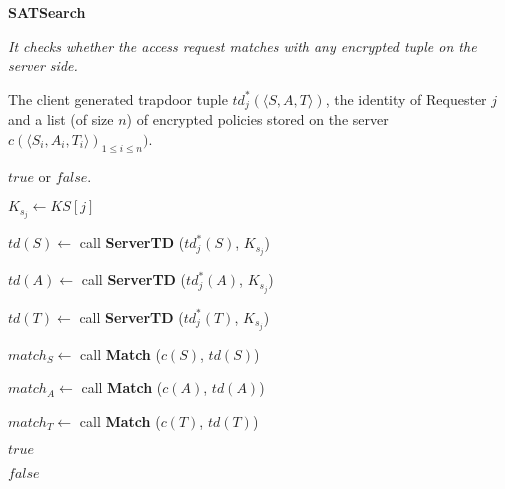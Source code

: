 \documentclass[epsfig,a4paper,11pt,titlepage]{book}
\numberwithin{algorithm}{chapter}
\newcommand{\algofontsize}{\fontsize{11}{12}\selectfont}
\begin{document}
\begin{algorithm} [htp]
{\algofontsize
\caption{\textbf{SATSearch}}

\label{algo:espoon-search-sat}

\begin{algorithmic}[1]

\INPUT \emph{It checks whether the access request matches with any encrypted tuple on the server side.}

\Require The client generated trapdoor tuple $td^*_j (\langle S, A, T \rangle)$, the identity of Requester $j$ and a list (of size $n$) of encrypted policies stored on the server $c(\langle S_i, A_i, T_i \rangle)_{1 \leq i \leq n})$.

\Ensure $\mathit{true}$ or $\mathit{false}$.

\medskip

\State $K_{s_j} \leftarrow KS[j]$ {\algofontsize {}} \label{line:espoon-search-sat-ks}

\State $td(S) \leftarrow$ call \textbf{ServerTD} ($td^*_j (S)$, $K_{s_j}$) \label{line:espoon-search-sat-td-s}

\State $td(A) \leftarrow$ call \textbf{ServerTD} ($td^*_j (A)$, $K_{s_j}$) \label{line:espoon-search-sat-td-a}

\State $td(T) \leftarrow$ call \textbf{ServerTD} ($td^*_j (T)$, $K_{s_j}$) \label{line:espoon-search-sat-td-t}

 \label{line:espoon-search-sat-loop}

	\State $match_S \leftarrow$ call \textbf{Match} ($c(S)$, $td(S)$) \label{line:espoon-search-sat-match-s}
	
	\State $match_A \leftarrow$ call \textbf{Match} ($c(A)$, $td(A)$) \label{line:espoon-search-sat-match-a}
	
	\State $match_T \leftarrow$ call \textbf{Match} ($c(T)$, $td(T)$) \label{line:espoon-search-sat-match-t}

	 \label{line:espoon-search-sat-check-match}
		
		\Return $\mathit{true}$
		
	\EndIf

\EndFor

\Return $\mathit{false}$

\end{algorithmic}
}
\end{algorithm}
\end{document}
